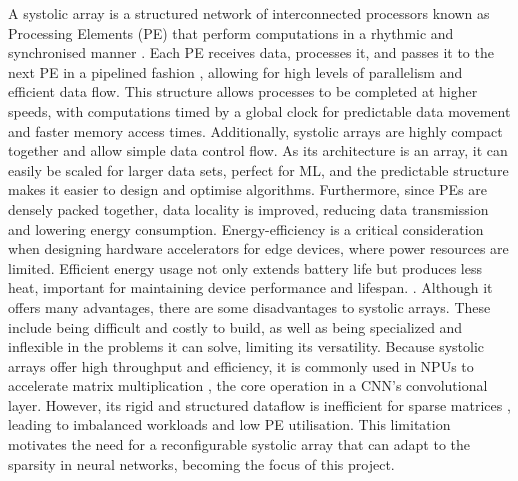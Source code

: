 \documentclass[12pt, a4paper, ukenglish]{article}
\begin{document}
    A systolic array is a structured network of interconnected processors known as Processing Elements (PE) that perform computations in a rhythmic and synchronised manner \cite{kung_systolic_1978}. Each PE receives data, processes it, and passes it to the next PE in a pipelined fashion \cite{sun_sense_2023}, allowing for high levels of parallelism and efficient data flow. This structure allows processes to be completed at higher speeds, with computations timed by a global clock for predictable data movement and faster memory access times. Additionally, systolic arrays are highly compact together and allow simple data control flow. As its architecture is an array, it can easily be scaled for larger data sets, perfect for ML, and the predictable structure makes it easier to design and optimise algorithms. Furthermore, since PEs are densely packed together, data locality is improved, reducing data transmission and lowering energy consumption. Energy-efficiency is a critical consideration when designing hardware accelerators for edge devices, where power resources are limited. Efficient energy usage not only extends battery life but produces less heat, important for maintaining device performance and lifespan. .
    \newline \newline
    Although it offers many advantages, there are some disadvantages to systolic arrays. These include being difficult and costly to build, as well as being specialized and inflexible in the problems it can solve, limiting its versatility. Because systolic arrays offer high throughput and efficiency, it is commonly used in NPUs to accelerate matrix multiplication \cite{seo_versa_2024}, the core operation in a CNN's convolutional layer. However, its rigid and structured dataflow is inefficient for sparse matrices \cite{he_sparse-tpu_2020,sun_sense_2023}, leading to imbalanced workloads and low PE utilisation. This limitation motivates the need for a reconfigurable systolic array that can adapt to the sparsity in neural networks, becoming the focus of this project.
    
    


\end{document}
